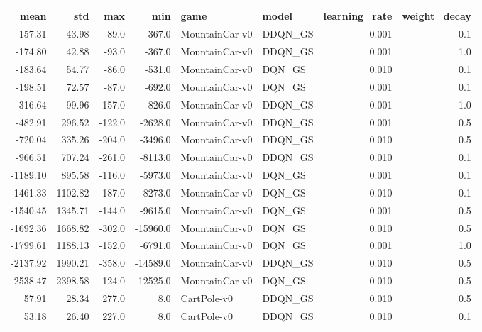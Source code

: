 \begin{tabular}{rrrrllrr}
\toprule
    mean &      std &    max &      min &            game &    model &  learning\_rate &  weight\_decay \\
\midrule
 -157.31 &    43.98 &  -89.0 &   -367.0 &  MountainCar-v0 &  DDQN\_GS &          0.001 &           0.1 \\
 -174.80 &    42.88 &  -93.0 &   -367.0 &  MountainCar-v0 &  DDQN\_GS &          0.001 &           1.0 \\
 -183.64 &    54.77 &  -86.0 &   -531.0 &  MountainCar-v0 &   DQN\_GS &          0.010 &           0.1 \\
 -198.51 &    72.57 &  -87.0 &   -692.0 &  MountainCar-v0 &   DQN\_GS &          0.001 &           0.1 \\
 -316.64 &    99.96 & -157.0 &   -826.0 &  MountainCar-v0 &  DDQN\_GS &          0.001 &           1.0 \\
 -482.91 &   296.52 & -122.0 &  -2628.0 &  MountainCar-v0 &  DDQN\_GS &          0.001 &           0.5 \\
 -720.04 &   335.26 & -204.0 &  -3496.0 &  MountainCar-v0 &  DDQN\_GS &          0.010 &           0.5 \\
 -966.51 &   707.24 & -261.0 &  -8113.0 &  MountainCar-v0 &  DDQN\_GS &          0.010 &           0.1 \\
-1189.10 &   895.58 & -116.0 &  -5973.0 &  MountainCar-v0 &   DQN\_GS &          0.001 &           0.1 \\
-1461.33 &  1102.82 & -187.0 &  -8273.0 &  MountainCar-v0 &   DQN\_GS &          0.010 &           0.1 \\
-1540.45 &  1345.71 & -144.0 &  -9615.0 &  MountainCar-v0 &   DQN\_GS &          0.001 &           0.5 \\
-1692.36 &  1668.82 & -302.0 & -15960.0 &  MountainCar-v0 &   DQN\_GS &          0.010 &           0.5 \\
-1799.61 &  1188.13 & -152.0 &  -6791.0 &  MountainCar-v0 &   DQN\_GS &          0.001 &           1.0 \\
-2137.92 &  1990.21 & -358.0 & -14589.0 &  MountainCar-v0 &  DDQN\_GS &          0.010 &           0.5 \\
-2538.47 &  2398.58 & -124.0 & -12525.0 &  MountainCar-v0 &   DQN\_GS &          0.010 &           0.5 \\
   57.91 &    28.34 &  277.0 &      8.0 &     CartPole-v0 &  DDQN\_GS &          0.010 &           0.5 \\
   53.18 &    26.40 &  227.0 &      8.0 &     CartPole-v0 &  DDQN\_GS &          0.010 &           0.1 \\

\end{tabular}
